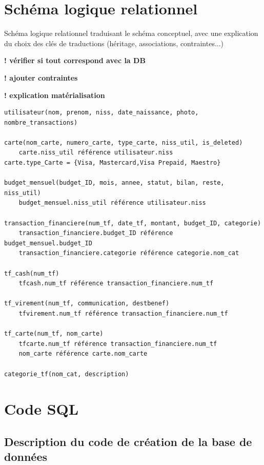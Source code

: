 \documentclass[a4paper,12pt]{article}
\begin{document}
\newpage 

\section{Schéma logique relationnel}

Schéma logique relationnel traduisant le schéma conceptuel, avec une explication du choix des clés de traductions (héritage, associations, contraintes...)

\textbf{! vérifier si tout correspond avec la DB}

\textbf{! ajouter contraintes}

\textbf{!  explication matérialisation}


\begin{verbatim}
utilisateur(nom, prenom, niss, date_naissance, photo, nombre_transactions)

carte(nom_carte, numero_carte, type_carte, niss_util, is_deleted)
	carte.niss_util référence utilisateur.niss
carte.type_Carte = {Visa, Mastercard,Visa Prepaid, Maestro}

budget_mensuel(budget_ID, mois, annee, statut, bilan, reste, niss_util) 
	budget_mensuel.niss_util référence utilisateur.niss

transaction_financiere(num_tf, date_tf, montant, budget_ID, categorie)
	transaction_financiere.budget_ID référence budget_mensuel.budget_ID
	transaction_financiere.categorie référence categorie.nom_cat

tf_cash(num_tf)
	tfcash.num_tf référence transaction_financiere.num_tf

tf_virement(num_tf, communication, destbenef)
	tfvirement.num_tf référence transaction_financiere.num_tf

tf_carte(num_tf, nom_carte)
	tfcarte.num_tf référence transaction_financiere.num_tf	
	nom_carte référence carte.nom_carte

categorie_tf(nom_cat, description)
\end{verbatim}

\newpage

\section{Code SQL}

\subsection{Description du code de création de la base de données}
\end{document}
